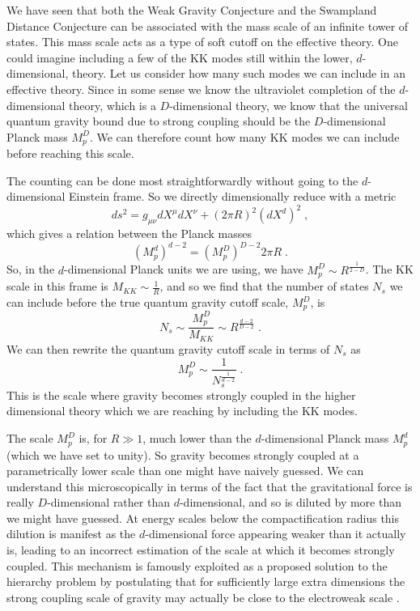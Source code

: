 \documentclass[11pt,a4paper]{article}
\numberwithin{equation}{section}
\numberwithin{table}{section}\setlength{\multlinegap}{25pt}
\newcommand{\be}{\begin{equation}}
\newcommand{\ee}{\end{equation}}
\begin{document}
We have seen that both the Weak Gravity Conjecture and the Swampland Distance Conjecture can be associated with the mass scale of an infinite tower of states. This mass scale acts as a type of soft cutoff on the effective theory. One could imagine including a few of the KK modes still within the lower, $d$-dimensional, theory. Let us consider how many such modes we can include in an effective theory. Since in some sense we know the ultraviolet completion of the $d$-dimensional theory, which is a $D$-dimensional theory, we know that the universal quantum gravity bound due to strong coupling should be the $D$-dimensional Planck mass $M_p^D$. We can therefore count how many KK modes we can include before reaching this scale. 

The counting can be done most straightforwardly without going to the $d$-dimensional Einstein frame. So we directly dimensionally reduce with a metric
\be
ds^2 = g_{\mu\nu} dX^{\mu} dX^{\nu} + \left(2\pi R \right)^2 \left(dX^d\right)^2 \;,
\ee
which gives a relation between the Planck masses
\be
\left(M_p^d\right)^{d-2} = \left(M^D_p\right)^{D-2} 2\pi R \;.
\ee
So, in the $d$-dimensional Planck units we are using, we have $M^D_p \sim R^{\frac{1}{2-D}}$. The KK scale in this frame is $M_{KK} \sim \frac{1}{R}$, and so we find that the number of states $N_s$ we can include before the true quantum gravity cutoff scale, $M_p^D$, is
\be
N_s \sim \frac{M_p^D}{M_{KK}} \sim R^{\frac{d-2}{D-2}} \;.
\ee
We can then rewrite the quantum gravity cutoff scale in terms of $N_s$ as
\be
\label{Ddimspecies}
M_p^D \sim \frac{1}{N_s^{\frac{1}{d-2}}} \;.
\ee
This is the scale where gravity becomes strongly coupled in the higher dimensional theory which we are reaching by including the KK modes. 

The scale $M_p^D$ is, for $R \gg 1$, much lower than the $d$-dimensional Planck mass $M_p^d$ (which we have set to unity). So gravity becomes strongly coupled at a parametrically lower scale than one might have naively guessed. We can understand this microscopically in terms of the fact that the gravitational force is really $D$-dimensional rather than $d$-dimensional, and so is diluted by more than we might have guessed. At energy scales below the compactification radius this dilution is manifest as the $d$-dimensional force appearing weaker than it actually is, leading to an incorrect estimation of the scale at which it becomes strongly coupled. This mechanism is famously exploited as a proposed solution to the hierarchy problem by postulating that for sufficiently large extra dimensions the strong coupling scale of gravity may actually be close to the electroweak scale \cite{ArkaniHamed:1998rs}. 
\end{document}
